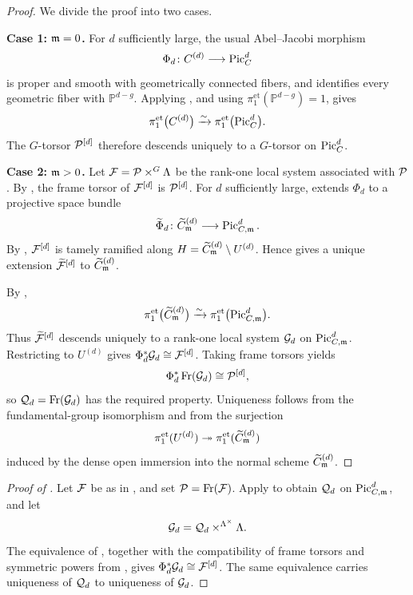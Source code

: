 \begin{proof}
We divide the proof into two cases.

\textbf{Case 1: $\mdls=0$.}
For $d$ sufficiently large,
the usual Abel--Jacobi morphism
\[
\Phi_d\colon C^{(d)}\longrightarrow\PicC[d]
\]
is proper and smooth with geometrically connected fibers, and
 identifies every geometric fiber with
$\mathbb P^{d-g}$. Applying
, and using
$\pi_1^{\mathrm{et}}(\mathbb P^{d-g})=1$, gives
\[
\pi_1^{\mathrm{et}}\bigl(C^{(d)}\bigr)
 \xrightarrow{\sim}
\pi_1^{\mathrm{et}}\bigl(\PicC[d]\bigr).
\]
The $G$-torsor $\cP^{[d]}$ therefore descends uniquely to a $G$-torsor on
$\PicC[d]$.

\textbf{Case 2: $\mdls>0$.}
Let $\cF=\cP\times^G\Lambda$ be the rank-one local system associated with
$\cP$. By , the frame torsor
of $\cF^{[d]}$ is $\cP^{[d]}$. For $d$ sufficiently large,
 extends $\Phi_d$ to a
projective space bundle
\[
\widetilde\Phi_d\colon
\widetilde C^{(d)}_\mdls\longrightarrow\PicCm[d].
\]
By ,
$\cF^{[d]}$ is tamely ramified along
$H=\widetilde C^{(d)}_\mdls\setminus U^{(d)}$. Hence
 gives a unique extension
$\widetilde{\cF}^{[d]}$ to $\widetilde C^{(d)}_\mdls$.

By ,
\[
\pi_1^{\mathrm{et}}\bigl(\widetilde C^{(d)}_\mdls\bigr)
 \xrightarrow{\sim}
\pi_1^{\mathrm{et}}\bigl(\PicCm[d]\bigr).
\]
Thus $\widetilde{\cF}^{[d]}$ descends uniquely to a rank-one local system
$\cG_d$ on $\PicCm[d]$. Restricting to $U^{(d)}$ gives
$\Phi_d^*\cG_d\cong\cF^{[d]}$. Taking frame torsors yields
\[
\Phi_d^*\operatorname{Fr}(\cG_d)\cong\cP^{[d]},
\]
so $\cQ_d=\operatorname{Fr}(\cG_d)$ has the required property. Uniqueness
follows from the fundamental-group isomorphism and from the surjection
\[
\pi_1^{\mathrm{et}}(U^{(d)})\twoheadrightarrow
\pi_1^{\mathrm{et}}(\widetilde C^{(d)}_\mdls)
\]
induced by the dense open immersion into the normal scheme
$\widetilde C^{(d)}_\mdls$.
\end{proof}

\begin{proof}[Proof of ]
Let $\cF$ be as in , and set
$\cP=\operatorname{Fr}(\cF)$. Apply  to obtain
$\cQ_d$ on $\PicCm[d]$, and let
\[
\cG_d=\cQ_d\times^{\Lambda^\times}\Lambda.
\]
The equivalence of , together with the
compatibility of frame torsors and symmetric powers from
, gives
$\Phi_d^*\cG_d\cong\cF^{[d]}$. The same equivalence carries uniqueness of
$\cQ_d$ to uniqueness of $\cG_d$.
\end{proof}
